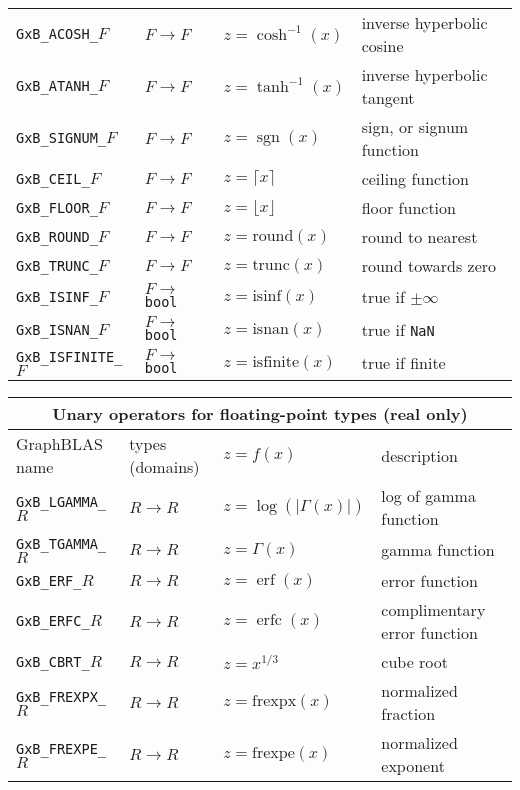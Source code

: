 \documentclass[12pt]{article}
\DeclareMathOperator{\sgn}{sgn}
\DeclareMathOperator{\erf}{erf}
\DeclareMathOperator{\erfc}{erfc}
\begin{document}
{\begin{tabular}{|llll|}
\verb'GxB_ACOSH_'$F$    & $F \rightarrow F$ & $z = \cosh^{-1}(x)$        & inverse hyperbolic cosine \\
\verb'GxB_ATANH_'$F$    & $F \rightarrow F$ & $z = \tanh^{-1}(x)$        & inverse hyperbolic tangent \\
\hline
\verb'GxB_SIGNUM_'$F$   & $F \rightarrow F$ & $z = \sgn(x)$                 & sign, or signum function \\
\verb'GxB_CEIL_'$F$     & $F \rightarrow F$ & $z = \lceil x \rceil $       & ceiling function \\
\verb'GxB_FLOOR_'$F$    & $F \rightarrow F$ & $z = \lfloor x \rfloor $     & floor function \\
\verb'GxB_ROUND_'$F$    & $F \rightarrow F$ & $z = \mbox{round}(x)$        & round to nearest \\
\verb'GxB_TRUNC_'$F$    & $F \rightarrow F$ & $z = \mbox{trunc}(x)$        & round towards zero \\
\hline
\verb'GxB_ISINF_'$F$    & $F \rightarrow $ \verb'bool' & $z = \mbox{isinf}(x)$ & true if $\pm \infty$ \\
\verb'GxB_ISNAN_'$F$    & $F \rightarrow $ \verb'bool' & $z = \mbox{isnan}(x)$ & true if \verb'NaN' \\
\verb'GxB_ISFINITE_'$F$ & $F \rightarrow $ \verb'bool' & $z = \mbox{isfinite}(x)$ & true if finite \\
\hline
\end{tabular}
\vspace{0.2in}

\begin{tabular}{|llll|}
\hline
\multicolumn{4}{|c|}{Unary operators for floating-point types (real only)} \\
\hline
GraphBLAS name          & types (domains)   & $z=f(x)$      & description \\
\hline
\verb'GxB_LGAMMA_'$R$   & $R \rightarrow R$ & $z = \log(|\Gamma (x)|)$  & log of gamma function \\
\verb'GxB_TGAMMA_'$R$   & $R \rightarrow R$ & $z = \Gamma(x)$        & gamma function \\
\verb'GxB_ERF_'$R$      & $R \rightarrow R$ & $z = \erf(x)$          & error function \\
\verb'GxB_ERFC_'$R$     & $R \rightarrow R$ & $z = \erfc(x)$         & complimentary error function \\
\verb'GxB_CBRT_'$R$     & $R \rightarrow R$ & $z = x^{1/3}$          & cube root \\
\hline
\verb'GxB_FREXPX_'$R$   & $R \rightarrow R$ & $z = \mbox{frexpx}(x)$  & normalized fraction \\
\verb'GxB_FREXPE_'$R$   & $R \rightarrow R$ & $z = \mbox{frexpe}(x)$  & normalized exponent \\
\hline
\end{tabular}
\vspace{0.2in}

}
\end{document}
